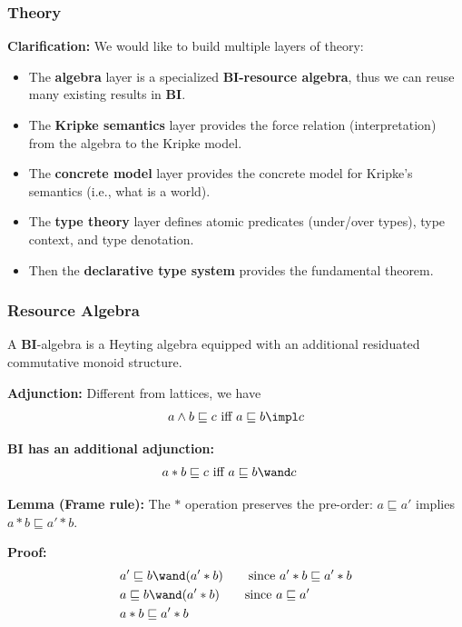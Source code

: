 


\begin{frame}[fragile]
    \frametitle{Theory}

\textbf{Clarification:} We would like to build multiple layers of theory:
\begin{itemize}
    \item The \textbf{algebra} layer is a specialized \textbf{BI-resource algebra}, thus we can reuse many existing results in \textbf{BI}.
    \item The \textbf{Kripke semantics} layer provides the force relation (interpretation) from the algebra to the Kripke model.
    \item The \textbf{concrete model} layer provides the concrete model for Kripke's semantics (i.e., what is a world).
    \item The \textbf{type theory} layer defines atomic predicates (under/over types), type context, and type denotation.
    \item Then the \textbf{declarative type system} provides the fundamental theorem.
\end{itemize}
        
\end{frame}

\begin{frame}[fragile]
    \frametitle{Resource Algebra}

A \textbf{BI}-algebra is a Heyting algebra equipped with an additional residuated commutative monoid structure.

\textbf{Adjunction:} Different from lattices, we have
\begin{align*}
    a \land b \sqsubseteq c \text{ iff } a \sqsubseteq b \impl c
\end{align*}\noindent

\textbf{BI has an additional adjunction:}
\begin{align*}
    &a * b \sqsubseteq c \text{ iff } a \sqsubseteq b \wand c
\end{align*}\noindent

\textbf{Lemma (Frame rule):} The $*$ operation preserves the pre-order: $a \sqsubseteq a'$ implies $a * b \sqsubseteq a' * b$.

\textbf{Proof:} 
\begin{align*}
    &a' \sqsubseteq b \wand (a' * b)  \qquad \text{since } a' * b \sqsubseteq a' * b
    \\&a \sqsubseteq b \wand (a' * b)  \qquad \text{since } a \sqsubseteq a'
    \\&a * b \sqsubseteq a' * b 
\end{align*}\noindent
        
\end{frame}

